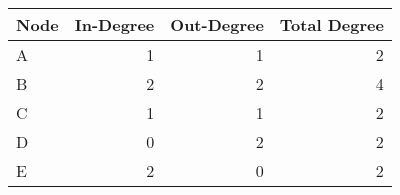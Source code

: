 \documentclass[preview, border=2mm]{standalone}
\begin{document}
{\sffamily\everymath{\sf}

\vspace*{\fill}

\begin{table}[h]
\centering
\begin{tabular}{lrrr}
\toprule
\textbf{Node} & \textbf{In-Degree} & \textbf{Out-Degree} & \textbf{Total Degree} \\
\midrule
A & 1 & 1 & 2 \\
B & 2 & 2 & 4 \\
C & 1 & 1 & 2 \\
D & 0 & 2 & 2 \\
E & 2 & 0 & 2 \\
\bottomrule
\end{tabular}
\end{table}

\vspace*{\fill}

}
\end{document}

